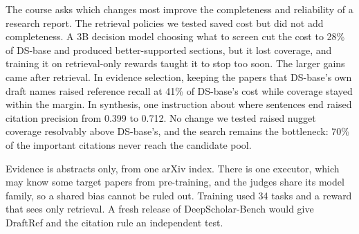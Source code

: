 \documentclass[11pt, letterpaper]{article}
\begin{document}
The course asks which changes most improve the completeness and reliability of a research report.
The retrieval policies we tested saved cost but did not add completeness. A 3B decision model
choosing what to screen cut the cost to 28\% of DS-base and produced better-supported sections, but
it lost coverage, and training it on retrieval-only rewards taught it to stop too soon. The larger
gains came after retrieval. In evidence selection, keeping the papers that DS-base's own draft names
raised reference recall at 41\% of DS-base's cost while coverage stayed within the margin. In
synthesis, one instruction about where sentences end raised citation precision from 0.399 to 0.712.
No change we tested raised nugget coverage resolvably above DS-base's, and the search remains the
bottleneck: 70\% of the important citations never reach the candidate pool.

Evidence is abstracts only, from one arXiv index. There is one executor,
which may know some target papers from pre-training, and the judges share its model family, so a
shared bias cannot be ruled out. Training used 34 tasks and a reward that sees only retrieval. A
fresh release of DeepScholar-Bench would give DraftRef and the citation rule an independent test.
\end{document}
